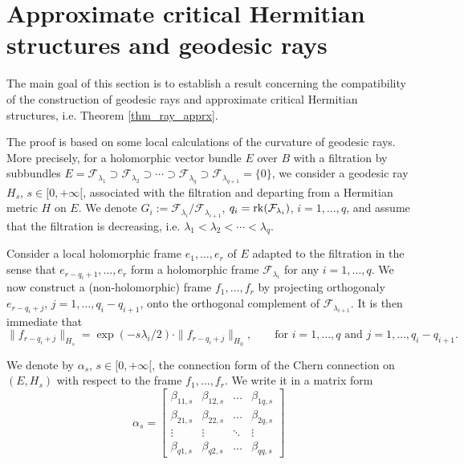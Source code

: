 \documentclass[12pt]{article}
\numberwithin{equation}{section}
\theoremstyle{theorem}
\theoremstyle{definition}
\theoremstyle{remark}
\newcommand{\rk}[1]{{\rm{rk}} ( #1 )}
\begin{document}
	\section{Approximate critical Hermitian structures and geodesic rays}\label{sect_geod_appr}
	The main goal of this section is to establish a result concerning the compatibility of the construction of geodesic rays and approximate critical Hermitian structures, i.e. Theorem \ref{thm_ray_apprx}.
	\par 
	The proof is based on some local calculations of the curvature of geodesic rays.
	More precisely, for a holomorphic vector bundle $E$ over $B$ with a filtration by subbundles $E = \mathcal{F}_{\lambda_1} \supset \mathcal{F}_{\lambda_2} \supset \cdots \supset \mathcal{F}_{\lambda_q} \supset \mathcal{F}_{\lambda_{q + 1}} = \{ 0 \}$, we consider a geodesic ray $H_s$, $s \in [0, +\infty[$, associated with the filtration and departing from a Hermitian metric $H$ on $E$.
	We denote $G_i := \mathcal{F}_{\lambda_i} / \mathcal{F}_{\lambda_{i + 1}}$, $q_i = \rk{\mathcal{F}_{\lambda_i}}$, $i = 1, \ldots, q$, and assume that the filtration is decreasing, i.e. $\lambda_1 < \lambda_2 < \cdots < \lambda_q$.
	\par 
	Consider a local holomorphic frame $e_1, \ldots, e_r$ of $E$ adapted to the filtration in the sense that $e_{r - q_i + 1}, \ldots, e_r$ form a holomorphic frame $\mathcal{F}_{\lambda_i}$ for any $i = 1, \ldots, q$.
	We now construct a (non-holomorphic) frame $f_1, \ldots, f_r$ by projecting orthogonaly $e_{r - q_i + j}$, $j = 1, \ldots, q_i - q_{i + 1}$, onto the orthogonal complement of $\mathcal{F}_{\lambda_{i + 1}}$.
	It is then immediate that
	\begin{equation}\label{eq_f_hs_calc}
		\| f_{r - q_i + j} \|_{H_s} = \exp(- s \lambda_i / 2) \cdot \| f_{r - q_i + j} \|_{H_0}, \qquad \text{for } i = 1, \ldots, q \text{ and } j = 1, \ldots, q_i - q_{i + 1}.
	\end{equation}
	\par 
	We denote by $\alpha_s$, $s \in [0, +\infty[$, the connection form of the Chern connection on $(E, H_s)$ with respect to the frame $f_1, \ldots, f_r$.
	We write it in a matrix form
	\begin{equation}\label{eq_alph_beta_gen_form}
	\alpha_s 
	=
	\begin{bmatrix}
    	\beta_{11, s} & \beta_{12, s} &  \dots  & \beta_{1q, s} \\
  		\beta_{21, s} & \beta_{22, s} &  \dots  & \beta_{2q, s} \\
  		\vdots & \vdots & \ddots & \vdots \\
  		\beta_{q1, s} & \beta_{q2, s} &  \dots  & \beta_{qq, s}
	\end{bmatrix}
	\end{equation}
\end{document}
